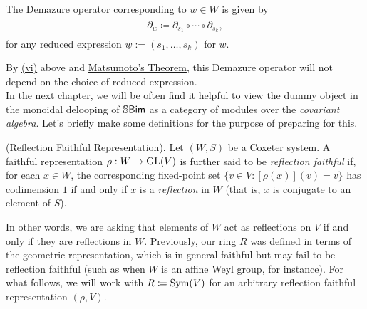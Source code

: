 \noindent\begin{definition} The Demazure operator corresponding to $w \in W$ is given by
\begin{align*}
\begin{split}
\partial_w \coloneqq \partial_{s_1} \circ \cdots \circ \partial_{s_k},
\end{split}
\end{align*}
for any reduced expression $\underline{w} := (s_1, \dots, s_k)$ for $w$.\\
\end{definition}

\noindent By \hyperref[DemazureBraid]{(vi)} above and \hyperref[Matsumoto]{Matsumoto's Theorem}, this Demazure operator will not depend on the choice of reduced expression.\\

\noindent In the next chapter, we will be often find it helpful to view the dummy object in the monoidal delooping of $\mathbb{S}\textup{\textsf{Bim}}$ as a category of modules over the {\em covariant algebra}. Let's briefly make some definitions for the purpose of preparing for this.\\

\noindent\begin{definition}\textup{(Reflection Faithful Representation).} Let $(W, S)$ be a Coxeter system. A faithful representation $\rho : W \to \textup{GL}(V)$ is further said to be {\em reflection faithful} if, for each $x \in W$, the corresponding fixed-point set $\{v \in V : [\rho(x)](v) = v\}$ has codimension $1$ if and only if $x$ is a {\em reflection} in $W$ (that is, $x$ is conjugate to an element of $S$).\\
\end{definition}
\newpage

\noindent In other words, we are asking that elements of $W$ act as reflections on $V$ if and only if they are reflections in $W$. Previously, our ring $R$ was defined in terms of the geometric representation, which is in general faithful but may fail to be reflection faithful (such as when $W$ is an affine Weyl group, for instance). For what follows, we will work with $R \coloneqq \textup{Sym}(V)$ for an arbitrary reflection faithful representation $(\rho, V)$.\\

